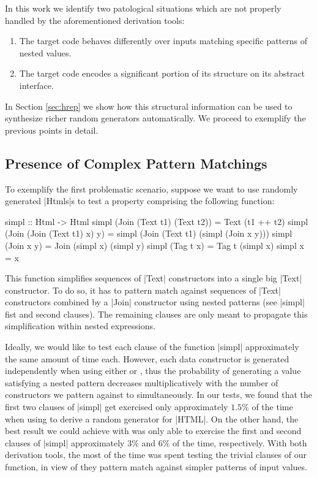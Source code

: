 
In this work we identify two patological situations which are not properly
handled by the aforementioned derivation tools:

\begin{enumerate}
\item The target code behaves differently over inputs matching specific patterns
  of nested values.
\item The target code encodes a significant portion of its structure on its
  abstract interface.
\end{enumerate}

In Section \ref{sec:hrep} we show how this structural information can be used to
synthesize richer random generators automatically.
%
We proceed to exemplify the previous points in detail.

\subsection*{\textbf{Presence of Complex Pattern Matchings}}

To exemplify the first problematic scenario, suppose we want to use randomly
generated |Htmls|s to test a property comprising the following function:
%
\begin{code}
simpl :: Html -> Html
simpl (Join (Text t1) (Text t2))
  = Text (t1 ++ t2)
simpl (Join (Join (Text t1) x) y)
  = simpl (Join (Text t1) (simpl (Join x y)))
simpl (Join x y) = Join (simpl x) (simpl y)
simpl (Tag t x) = Tag t (simpl x)
simpl x = x
\end{code}

This function simplifies sequences of |Text| constructors into a single big
|Text| constructor.
%
To do so, it has to pattern match against sequences of |Text| constructors
combined by a |Join| constructor using nested patterns (see |simpl| fist and
second clauses).
%
The remaining clauses are only meant to propagate this simplification within
nested expressions.


Ideally, we would like to test each clause of the function |simpl| approximately
the same amount of time each.
%
However, each data constructor is generated independently when using either
\megadeth or \dragen, thus the probability of generating a value satisfying a
nested pattern decreases multiplicatively with the number of constructors we
pattern against to simultaneously.
%
In our tests, we found that the first two clauses of |simpl| get exercised only
approximately $1.5\%$ of the time when using \megadeth to derive a random
generator for |HTML|.
%
On the other hand, the best result we could achieve with \dragen was only able
to exercise the first and second clauses of |simpl| approximately $3\%$ and
$6\%$ of the time, respectively.
%
With both derivation tools, the most of the time was spent testing the trivial
clauses of our function, in view of they pattern match against simpler patterns
of input values.

